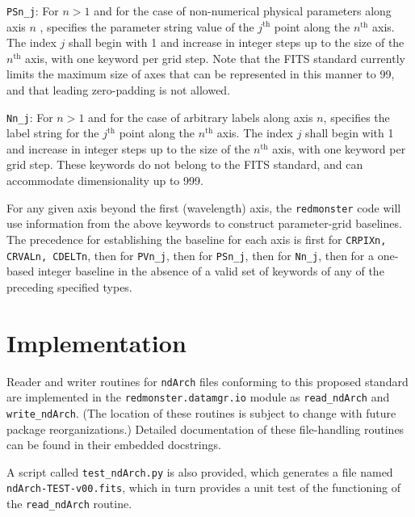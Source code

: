 \documentclass[12pt]{article}
\begin{document}
\noindent \texttt{PSn\_j}: For $n > 1$ and for the case of non-numerical
physical parameters along axis $n$ , specifies the parameter string value
of the $j^{\mathrm{th}}$ point along the $n^{\mathrm{th}}$ axis.
The index $j$ shall begin with 1 and increase in integer steps up to the
size of the $n^{\mathrm{th}}$ axis, with one keyword per grid step.
Note that the FITS standard currently limits the maximum size of axes
that can be represented in this manner to 99, and that leading zero-padding
is not allowed.

\noindent \texttt{Nn\_j}: For $n > 1$ and for the case of arbitrary labels
along axis $n$, specifies the label string for the $j^{\mathrm{th}}$
point along the $n^{\mathrm{th}}$ axis.
The index $j$ shall begin with 1 and increase in integer steps up to the
size of the $n^{\mathrm{th}}$ axis, with one keyword per grid step.
These keywords do not belong to the FITS standard,
and can accommodate dimensionality up to 999.

For any given axis beyond the first (wavelength) axis, the
\texttt{redmonster} code will use information from the above keywords
to construct parameter-grid baselines.  The precedence
for establishing the baseline for each axis is
first for \texttt{CRPIXn, CRVALn, CDELTn}, then for
\texttt{PVn\_j}, then for \texttt{PSn\_j}, then
for \texttt{Nn\_j}, then for a one-based integer baseline
in the absence of a valid set of keywords of any of the preceding
specified types.

\section{Implementation}

Reader and writer routines for \texttt{ndArch} files conforming
to this proposed standard are implemented in the \texttt{redmonster.datamgr.io}
module as \texttt{read\_ndArch} and \texttt{write\_ndArch}.
(The location of these routines is subject to change
with future package reorganizations.)
Detailed documentation of these file-handling
routines can be found in their embedded docstrings.

A script called \texttt{test\_ndArch.py} is also provided,
which generates a file named \texttt{ndArch-TEST-v00.fits},
which in turn provides a unit test of the functioning of
the \texttt{read\_ndArch} routine.
\end{document}
